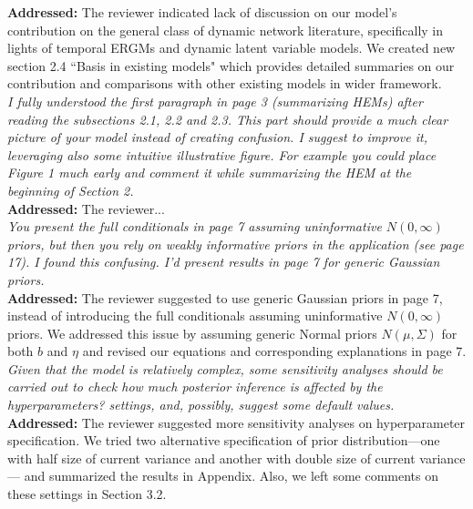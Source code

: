 \documentclass[12pt]{article}
\newcommand{\grey}[1]{{\color{mygrey}#1}}
\theoremstyle{definition}
\begin{document}
\noindent \textcolor{MyGreen}{\textbf{Addressed:}} The reviewer indicated lack of discussion on our model's contribution on the general class of dynamic network literature, specifically in lights of temporal ERGMs and dynamic latent variable models. We created new section 2.4 ``Basis in existing models" which provides detailed summaries on our contribution and comparisons with other existing models in wider framework. \\

 \grey{\emph{I fully understood the first paragraph in page 3 (summarizing HEMs) after reading the subsections 2.1, 2.2 and 2.3. This part should provide a much clear picture of your model instead of creating confusion. I suggest to improve it, leveraging also some intuitive illustrative figure. For example you could place Figure 1 much early and comment it while summarizing the HEM at the beginning of Section 2.}}\\

\noindent \textcolor{MyGreen}{\textbf{Addressed:}} The reviewer... \\


 \grey{\emph{You present the full conditionals in page 7 assuming uninformative $N(0, \infty)$ priors, but then you rely on weakly informative priors in the application (see page 17). I found this confusing. I'd present results in page 7 for generic Gaussian priors.}}\\

\noindent \textcolor{MyGreen}{\textbf{Addressed:}} The reviewer suggested to use generic Gaussian priors in page 7, instead of introducing the full conditionals assuming uninformative $N(0, \infty)$ priors. We addressed this issue by assuming generic Normal priors $N(\mu, \Sigma)$ for both $b$ and $\eta$ and revised our equations and corresponding explanations in page 7.\\


 \grey{\emph{Given that the model is relatively complex, some sensitivity analyses should be carried out to check how much posterior inference is affected by the hyperparameters? settings, and, possibly, suggest some default values.}}\\

\noindent \textcolor{MyGreen}{\textbf{Addressed:}} The reviewer suggested more sensitivity analyses on hyperparameter specification. We tried two alternative specification of prior distribution---one with half size of current variance and another with double size of current variance--- and summarized the results in Appendix. Also, we left some comments on these settings in Section 3.2.\\
\end{document}
